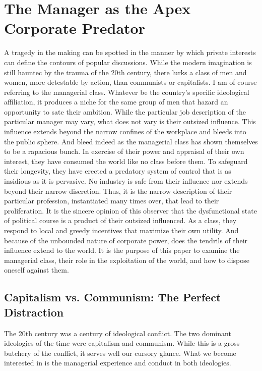 \documentclass[12pt]{article}
\begin{document}
\section{The Manager as the Apex Corporate Predator}
A tragedy in the making can be spotted in the manner by which private interests can define the contours of popular discussions.
While the modern imagination is still hauntec by the trauma of the 20th century, there lurks a class of men and women, more detestable by action, than communists or capitalists.
I am of course referring to the managerial class.
Whatever be the country's specific ideological affiliation, it produces a niche for the same group of men that hazard an opportunity to sate their ambition.
While the particular job description of the particular manager may vary, what does not vary is their outsized influence.
This influence extends beyond the narrow confines of the workplace and bleeds into the public sphere.
And bleed indeed as the managerial class has shown themselves to be a rapacious bunch.
In exercise of their power and appraisal of their own interest, they have consumed the world like no class before them.
To safeguard their longevity, they have erected a predatory system of control that is as insidious as it is pervasive.
No industry is safe from their influence nor extends beyond their narrow discretion.
Thus, it is the narrow description of their particular profession, instantiated many times over, that lead to their proliferation.
It is the sincere opinion of this observer that the dysfunctional state of political course is a product of their outsized influenced.
As a class, they respond to local and greedy incentives that maximize their own utility.
And because of the unbounded nature of corporate power, does the tendrils of their influence extend to the world.
It is the purpose of this paper to examine the managerial class, their role in the exploitation of the world, and how to dispose oneself against them.

\subsection{Capitalism vs. Communism: The Perfect Distraction}
The 20th century was a century of ideological conflict.
The two dominant ideologies of the time were capitalism and communism.
While this is a gross butchery of the conflict, it serves well our cursory glance.
What we become interested in is the managerial experience and conduct in both ideologies.
\end{document}
